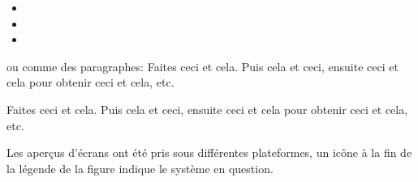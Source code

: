 \begin{itemize}[label=--]
\item {}
\item {}
\item {}
\end{itemize}
ou comme des paragraphes:
\vspace{0.5cm}
\nix{} \osx{} Faites ceci et cela. Puis cela et ceci, ensuite ceci et cela pour obtenir ceci et cela, etc. 
\par
\vspace{0.5cm}
\win{}Faites ceci et cela. Puis cela et ceci, ensuite ceci et cela pour obtenir ceci et cela, etc. 
\par\vspace{0.5cm}
Les aperçus d'écrans ont été pris sous différentes plateformes, un icône à la fin de la légende de la figure indique le système en question.
